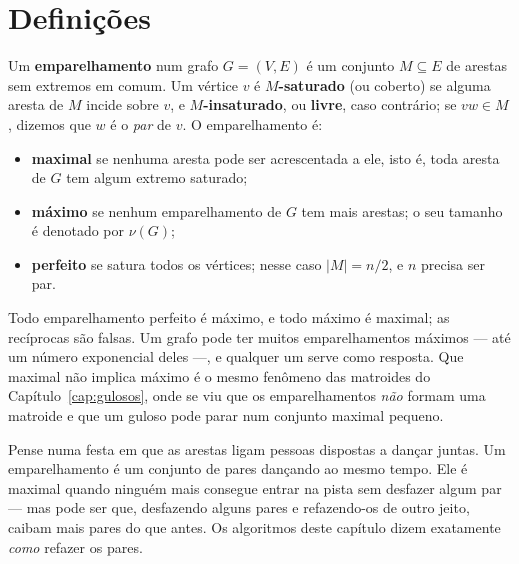 \section{Definições}\label{sec:emp}
Um \textbf{emparelhamento} num grafo $G=(V,E)$ é um conjunto $M\subseteq E$ de arestas sem extremos em comum. Um vértice $v$ é \textbf{$M$-saturado} (ou coberto) se alguma aresta de $M$ incide sobre $v$, e \textbf{$M$-insaturado}, ou \textbf{livre}, caso contrário; se $vw\in M$, dizemos que $w$ é o \emph{par} de $v$. O emparelhamento é:
\begin{itemize}
  \item \textbf{maximal} se nenhuma aresta pode ser acrescentada a ele, isto é, toda aresta de $G$ tem algum extremo saturado;
  \item \textbf{máximo} se nenhum emparelhamento de $G$ tem mais arestas; o seu tamanho é denotado por $\nu(G)$;
  \item \textbf{perfeito} se satura todos os vértices; nesse caso $|M|=n/2$, e $n$ precisa ser par.
\end{itemize}
Todo emparelhamento perfeito é máximo, e todo máximo é maximal; as recíprocas são falsas. Um grafo pode ter muitos emparelhamentos máximos --- até um número exponencial deles ---, e qualquer um serve como resposta. Que maximal não implica máximo é o mesmo fenômeno das matroides do Capítulo~\ref{cap:gulosos}, onde se viu que os emparelhamentos \emph{não} formam uma matroide e que um guloso pode parar num conjunto maximal pequeno.

\begin{intuicao}
Pense numa festa em que as arestas ligam pessoas dispostas a dançar juntas. Um emparelhamento é um conjunto de pares dançando ao mesmo tempo. Ele é maximal quando ninguém mais consegue entrar na pista sem desfazer algum par --- mas pode ser que, desfazendo alguns pares e refazendo-os de outro jeito, caibam mais pares do que antes. Os algoritmos deste capítulo dizem exatamente \emph{como} refazer os pares.
\end{intuicao}


